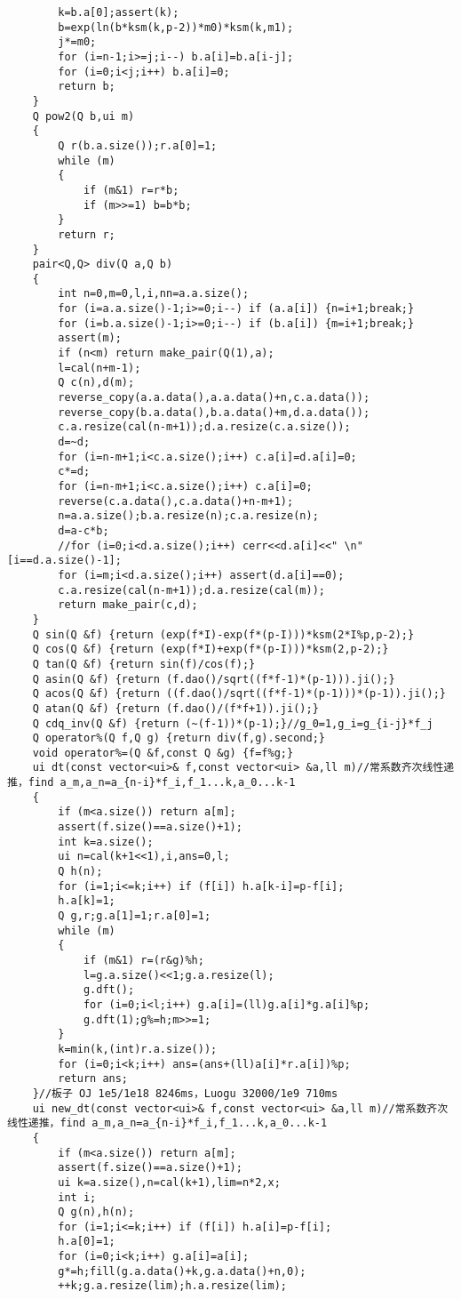 \documentclass[12pt]{ctexart}
\begin{document}
\begin{lstlisting}
		k=b.a[0];assert(k);
		b=exp(ln(b*ksm(k,p-2))*m0)*ksm(k,m1);
		j*=m0;
		for (i=n-1;i>=j;i--) b.a[i]=b.a[i-j];
		for (i=0;i<j;i++) b.a[i]=0;
		return b;
	}
	Q pow2(Q b,ui m)
	{
		Q r(b.a.size());r.a[0]=1;
		while (m)
		{
			if (m&1) r=r*b;
			if (m>>=1) b=b*b;
		}
		return r;
	}
	pair<Q,Q> div(Q a,Q b)
	{
		int n=0,m=0,l,i,nn=a.a.size();
		for (i=a.a.size()-1;i>=0;i--) if (a.a[i]) {n=i+1;break;}
		for (i=b.a.size()-1;i>=0;i--) if (b.a[i]) {m=i+1;break;}
		assert(m);
		if (n<m) return make_pair(Q(1),a);
		l=cal(n+m-1);
		Q c(n),d(m);
		reverse_copy(a.a.data(),a.a.data()+n,c.a.data());
		reverse_copy(b.a.data(),b.a.data()+m,d.a.data());
		c.a.resize(cal(n-m+1));d.a.resize(c.a.size());
		d=~d;
		for (i=n-m+1;i<c.a.size();i++) c.a[i]=d.a[i]=0;
		c*=d;
		for (i=n-m+1;i<c.a.size();i++) c.a[i]=0;
		reverse(c.a.data(),c.a.data()+n-m+1);
		n=a.a.size();b.a.resize(n);c.a.resize(n);
		d=a-c*b;
		//for (i=0;i<d.a.size();i++) cerr<<d.a[i]<<" \n"[i==d.a.size()-1];
		for (i=m;i<d.a.size();i++) assert(d.a[i]==0);
		c.a.resize(cal(n-m+1));d.a.resize(cal(m));
		return make_pair(c,d);
	}
	Q sin(Q &f) {return (exp(f*I)-exp(f*(p-I)))*ksm(2*I%p,p-2);}
	Q cos(Q &f) {return (exp(f*I)+exp(f*(p-I)))*ksm(2,p-2);}
	Q tan(Q &f) {return sin(f)/cos(f);}
	Q asin(Q &f) {return (f.dao()/sqrt((f*f-1)*(p-1))).ji();}
	Q acos(Q &f) {return ((f.dao()/sqrt((f*f-1)*(p-1)))*(p-1)).ji();}
	Q atan(Q &f) {return (f.dao()/(f*f+1)).ji();}
	Q cdq_inv(Q &f) {return (~(f-1))*(p-1);}//g_0=1,g_i=g_{i-j}*f_j
	Q operator%(Q f,Q g) {return div(f,g).second;}
	void operator%=(Q &f,const Q &g) {f=f%g;}
	ui dt(const vector<ui>& f,const vector<ui> &a,ll m)//常系数齐次线性递推，find a_m,a_n=a_{n-i}*f_i,f_1...k,a_0...k-1
	{
		if (m<a.size()) return a[m];
		assert(f.size()==a.size()+1);
		int k=a.size();
		ui n=cal(k+1<<1),i,ans=0,l;
		Q h(n);
		for (i=1;i<=k;i++) if (f[i]) h.a[k-i]=p-f[i];
		h.a[k]=1;
		Q g,r;g.a[1]=1;r.a[0]=1;
		while (m)
		{
			if (m&1) r=(r&g)%h;
			l=g.a.size()<<1;g.a.resize(l);
			g.dft();
			for (i=0;i<l;i++) g.a[i]=(ll)g.a[i]*g.a[i]%p;
			g.dft(1);g%=h;m>>=1;
		}
		k=min(k,(int)r.a.size());
		for (i=0;i<k;i++) ans=(ans+(ll)a[i]*r.a[i])%p;
		return ans;
	}//板子 OJ 1e5/1e18 8246ms，Luogu 32000/1e9 710ms
	ui new_dt(const vector<ui>& f,const vector<ui> &a,ll m)//常系数齐次线性递推，find a_m,a_n=a_{n-i}*f_i,f_1...k,a_0...k-1
	{
		if (m<a.size()) return a[m];
		assert(f.size()==a.size()+1);
		ui k=a.size(),n=cal(k+1),lim=n*2,x;
		int i;
		Q g(n),h(n);
		for (i=1;i<=k;i++) if (f[i]) h.a[i]=p-f[i];
		h.a[0]=1;
		for (i=0;i<k;i++) g.a[i]=a[i];
		g*=h;fill(g.a.data()+k,g.a.data()+n,0);
		++k;g.a.resize(lim);h.a.resize(lim);

\end{lstlisting}
\end{document}
